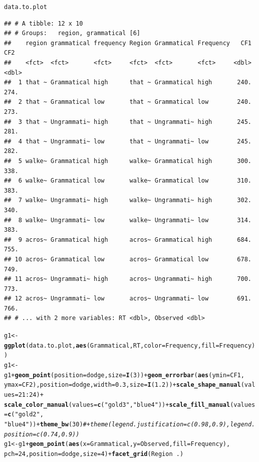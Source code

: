 \documentclass{article}\usepackage[]{graphicx}\usepackage[]{color}
\makeatletter
\newcommand{\hlnum}[1]{\textcolor[rgb]{0.686,0.059,0.569}{#1}}%
\newcommand{\hlstr}[1]{\textcolor[rgb]{0.192,0.494,0.8}{#1}}%
\newcommand{\hlcom}[1]{\textcolor[rgb]{0.678,0.584,0.686}{\textit{#1}}}%
\newcommand{\hlopt}[1]{\textcolor[rgb]{0,0,0}{#1}}%
\newcommand{\hlstd}[1]{\textcolor[rgb]{0.345,0.345,0.345}{#1}}%
\newcommand{\hlkwb}[1]{\textcolor[rgb]{0.69,0.353,0.396}{#1}}%
\newcommand{\hlkwc}[1]{\textcolor[rgb]{0.333,0.667,0.333}{#1}}%
\newcommand{\hlkwd}[1]{\textcolor[rgb]{0.737,0.353,0.396}{\textbf{#1}}}%
\newenvironment{kframe}{%
 \def\at@end@of@kframe{}%
 \ifinner\ifhmode%
  \def\at@end@of@kframe{\end{minipage}}%
  \begin{minipage}{\columnwidth}%
 \fi\fi%
 \def\FrameCommand##1{\hskip\@totalleftmargin \hskip-\fboxsep
 \colorbox{shadecolor}{##1}\hskip-\fboxsep
     \hskip-\linewidth \hskip-\@totalleftmargin \hskip\columnwidth}%
 \MakeFramed {\advance\hsize-\width
   \@totalleftmargin\z@ \linewidth\hsize
   \@setminipage}}%
 {\par\unskip\endMakeFramed%
 \at@end@of@kframe}
\newenvironment{knitrout}{}{} %
\makeatother
\begin{document}
\begin{knitrout}
\begin{kframe}
{\ttfamily\noindent\itshape\color{messagecolor}{\#\# `summarise()` has grouped output by 'region', 'grammatical'. You can override using the `.groups` argument.}}\begin{alltt}
\hlstd{data.to.plot}
\end{alltt}
\begin{verbatim}
## # A tibble: 12 x 10
## # Groups:   region, grammatical [6]
##    region grammatical frequency Region Grammatical Frequency   CF1   CF2
##    <fct>  <fct>       <fct>     <fct>  <fct>       <fct>     <dbl> <dbl>
##  1 that ~ Grammatical high      that ~ Grammatical high       240.  274.
##  2 that ~ Grammatical low       that ~ Grammatical low        240.  273.
##  3 that ~ Ungrammati~ high      that ~ Ungrammati~ high       245.  281.
##  4 that ~ Ungrammati~ low       that ~ Ungrammati~ low        245.  282.
##  5 walke~ Grammatical high      walke~ Grammatical high       300.  338.
##  6 walke~ Grammatical low       walke~ Grammatical low        310.  383.
##  7 walke~ Ungrammati~ high      walke~ Ungrammati~ high       302.  340.
##  8 walke~ Ungrammati~ low       walke~ Ungrammati~ low        314.  383.
##  9 acros~ Grammatical high      acros~ Grammatical high       684.  755.
## 10 acros~ Grammatical low       acros~ Grammatical low        678.  749.
## 11 acros~ Ungrammati~ high      acros~ Ungrammati~ high       700.  773.
## 12 acros~ Ungrammati~ low       acros~ Ungrammati~ low        691.  766.
## # ... with 2 more variables: RT <dbl>, Observed <dbl>
\end{verbatim}
\begin{alltt}
\hlstd{g1} \hlkwb{<-} \hlkwd{ggplot}\hlstd{(data.to.plot,} \hlkwd{aes}\hlstd{(Grammatical, RT,} \hlkwc{color} \hlstd{= Frequency,} \hlkwc{fill} \hlstd{= Frequency))}
\hlstd{g1} \hlkwb{<-} \hlstd{g1} \hlopt{+} \hlkwd{geom_point}\hlstd{(}\hlkwc{position} \hlstd{= dodge,} \hlkwc{size} \hlstd{=} \hlkwd{I}\hlstd{(}\hlnum{3}\hlstd{))} \hlopt{+} \hlkwd{geom_errorbar}\hlstd{(}\hlkwd{aes}\hlstd{(}\hlkwc{ymin} \hlstd{= CF1,}
    \hlkwc{ymax} \hlstd{= CF2),} \hlkwc{position} \hlstd{= dodge,} \hlkwc{width} \hlstd{=} \hlnum{0.3}\hlstd{,} \hlkwc{size} \hlstd{=} \hlkwd{I}\hlstd{(}\hlnum{1.2}\hlstd{))} \hlopt{+} \hlkwd{scale_shape_manual}\hlstd{(}\hlkwc{values} \hlstd{=} \hlnum{21}\hlopt{:}\hlnum{24}\hlstd{)} \hlopt{+}
    \hlkwd{scale_color_manual}\hlstd{(}\hlkwc{values} \hlstd{=} \hlkwd{c}\hlstd{(}\hlstr{"gold3"}\hlstd{,} \hlstr{"blue4"}\hlstd{))} \hlopt{+} \hlkwd{scale_fill_manual}\hlstd{(}\hlkwc{values} \hlstd{=} \hlkwd{c}\hlstd{(}\hlstr{"gold2"}\hlstd{,}
    \hlstr{"blue4"}\hlstd{))} \hlopt{+} \hlkwd{theme_bw}\hlstd{(}\hlnum{30}\hlstd{)}  \hlcom{# + theme(legend.justification = c(0.98, 0.9), legend.position = c(0.74, 0.9)) }
\hlstd{g1} \hlkwb{<-} \hlstd{g1} \hlopt{+} \hlkwd{geom_point}\hlstd{(}\hlkwd{aes}\hlstd{(}\hlkwc{x} \hlstd{= Grammatical,} \hlkwc{y} \hlstd{= Observed,} \hlkwc{fill} \hlstd{= Frequency),}
    \hlkwc{pch} \hlstd{=} \hlnum{24}\hlstd{,} \hlkwc{position} \hlstd{= dodge,} \hlkwc{size} \hlstd{=} \hlnum{4}\hlstd{)} \hlopt{+} \hlkwd{facet_grid}\hlstd{(Region} \hlopt{~} \hlstd{.)}
\end{alltt}
\end{kframe}
\end{knitrout}
\end{document}
